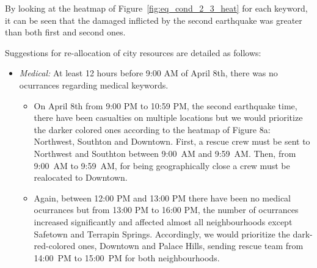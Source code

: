 By looking at the heatmap of Figure~\ref{fig:eq_cond_2_3_heat} for each
keyword, it can be seen that the damaged inflicted by the
second earthquake was greater than both first and second ones.

Suggestions for re-allocation of city resources are detailed as follows:   

\begin{itemize}                                                                  
     \item \emph{Medical:} At least 12 hours before 9:00 AM of April 8th, there was no ocurrances regarding
medical keywords. 
\begin{itemize} 
\item On April 8th from 9:00 PM to 10:59 PM, the second earthquake
time, there have been casualties on multiple locations
but we would prioritize the darker colored ones according to the heatmap of Figure 8a:
Northwest, Southton and Downtown. First, a rescue crew must be sent to Northwest
and Southton between     
     9:00~AM and 9:59~AM. Then, from 9:00~AM to 9:59~AM, for being geographically close a crew must be realocated to
Downtown. 

\item Again, between 12:00 PM and 13:00 PM there have been no medical ocurrances but from 13:00 PM
to 16:00 PM, the number of ocurrances increased significantly and affected
almost all neighbourhoods except Safetown and Terrapin Springs. Accordingly, we
would prioritize the dark-red-colored ones, Downtown and Palace Hills, sending
rescue team from 14:00~PM to 15:00~PM for both neighbourhoods.  


\end{itemize}
\end{itemize}
